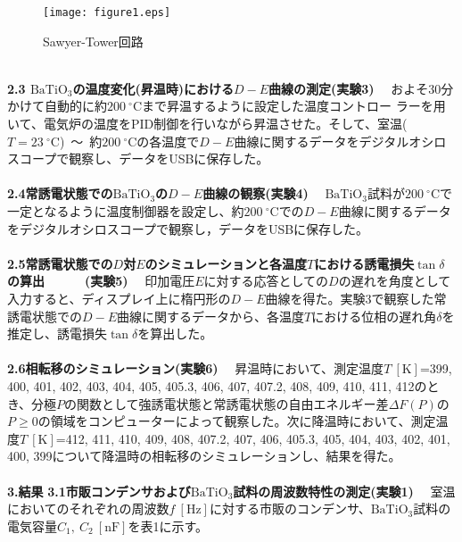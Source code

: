 \documentclass[a4paper,10.5pt]{ltjsarticle}
\begin{document}
\begin{figure}[ht]
\centering
\texttt{[image: figure1.eps]}
\caption{Sawyer-Tower回路}
\end{figure}
\\
\leftline
{\large \bfseries 2.3 $\mathrm{BaTiO_3}$の温度変化(昇温時)における$D-E$曲線の測定(実験3)}\linebreak
　およそ30分かけて自動的に約$200\ ^\circ \mathrm{C}$まで昇温するように設定した温度コントロー
ラーを用いて、電気炉の温度をPID制御を行いながら昇温させた。そして、室温($T=23\ ^\circ \mathrm{C}$)\ 〜\ 約$200\ ^\circ \mathrm{C}$の各温度で$D-E$曲線に関するデータをデジタルオシロスコープで観察し、データをUSBに保存した。\\
\\
\leftline
{\large \bfseries 2.4常誘電状態での$\mathrm{BaTiO_3}$の$D-E$曲線の観察(実験4)}\linebreak
　$\mathrm{BaTiO_3}$試料が$200\ ^\circ \mathrm{C}$で一定となるように温度制御器を設定し、約$200\ ^\circ \mathrm{C}$での$D-E$曲線に関するデータをデジタルオシロスコープで観察し，データをUSBに保存した。\\
\\
\clearpage
\leftline
{\large \bfseries 2.5常誘電状態での$D$対$E$のシミュレーションと各温度$T$における誘電損失$\tan{\delta}$の算出}
\leftline
{\large \bfseries \ \ \ \ \ (実験5)}
　印加電圧$E$に対する応答としての$D$の遅れを角度として入力すると、ディスプレイ上に楕円形の$D-E$曲線を得た。実験3で観察した常誘電状態での$D-E$曲線に関するデータから、各温度$T$における位相の遅れ角$\delta$を推定し、誘電損失$\tan{\delta}$を算出した。\\
\\
\leftline
{\large \bfseries 2.6相転移のシミュレーション(実験6)}
　昇温時において、測定温度$T\ [\mathrm{K}]$=399, 400, 401, 402, 403, 404, 405, 405.3, 406, 407, 407.2, 408, 409, 410, 411, 412のとき、分極$P$の関数として強誘電状態と常誘電状態の自由エネルギー差$\Delta F(P)$の$P ≥ 0$の領域をコンピューターによって観察した。次に降温時において、測定温度$T\ [\mathrm{K}]$=412, 411, 410, 409, 408, 407.2, 407, 406, 405.3, 405, 404, 403, 402, 401, 400, 399について降温時の相転移のシミュレーションし、結果を得た。\\
\\
\leftline
{\Large \bfseries 3.結果}\linebreak
\leftline
{\large \bfseries 3.1市販コンデンサおよび$\mathrm{BaTiO_3}$試料の周波数特性の測定(実験1)}\linebreak
　室温においてのそれぞれの周波数$f\ [\mathrm{Hz}]$に対する市販のコンデンサ、$\mathrm{BaTiO_3}$試料の電気容量$C_1,\ C_2 \ [\mathrm{nF}]$を表1に示す。
\end{document}
